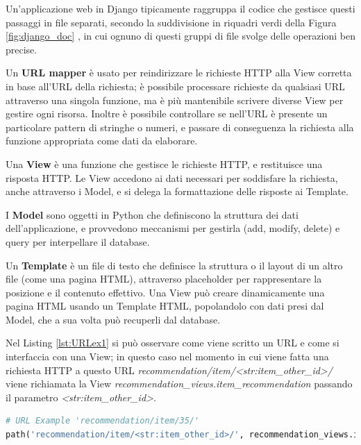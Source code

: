 \hfill\break
Un'applicazione web in Django tipicamente raggruppa il codice che gestisce questi passaggi in file separati, secondo la 
suddivisione in riquadri verdi della Figura \ref{fig:django_doc} \cite{mdn-django-documentation}, in cui ognuno di questi
gruppi di file svolge delle operazioni ben precise.
\begin{description}
    \item Un \textbf{URL mapper} è usato per reindirizzare le richieste HTTP alla View corretta in base all'URL della richiesta; è possibile processare 
    richieste da qualsiasi URL attraverso una singola funzione, ma è più mantenibile scrivere diverse View per gestire ogni risorsa. 
    Inoltre è possibile controllare se nell'URL è presente un particolare pattern di stringhe o numeri, e passare di conseguenza la richiesta alla 
    funzione appropriata come dati da elaborare.
    \item Una \textbf{View} è una funzione che gestisce le richieste HTTP, e restituisce una risposta HTTP. Le View accedono ai dati necessari per soddisfare la 
    richiesta, anche attraverso i Model, e si delega la formattazione delle risposte ai Template.
    \item I \textbf{Model} sono oggetti in Python che definiscono la struttura dei dati dell'applicazione, e provvedono meccanismi per gestirla (add, modify, 
    delete) e query per interpellare il database.
    \item Un \textbf{Template} è un file di testo che definisce la struttura o il layout di un altro file (come una pagina HTML), attraverso placeholder per
    rappresentare la posizione e il contenuto effettivo. Una View può creare dinamicamente una pagina HTML usando un Template HTML, popolandolo con dati presi dal Model, 
    che a sua volta può recuperli dal database.
\end{description}
Nel Listing \ref{lst:URLex1} si può osservare come viene scritto un URL e come si interfaccia con una View; in questo caso nel 
momento in cui viene fatta una richiesta HTTP a questo URL \textit{recommendation/item/<str:item\_other\_id>/} viene richiamata la 
View \textit{recommendation\_views.item\_recommendation} passando il parametro \textit{<str:item\_other\_id>}.
\lstset{style=python_code_style}
\begin{lstlisting}[language=Python, label=lst:URLex1]
# URL Example 'recommendation/item/35/'
path('recommendation/item/<str:item_other_id>/', recommendation_views.item_recommendation, name='item_recommendation')
\end{lstlisting}
